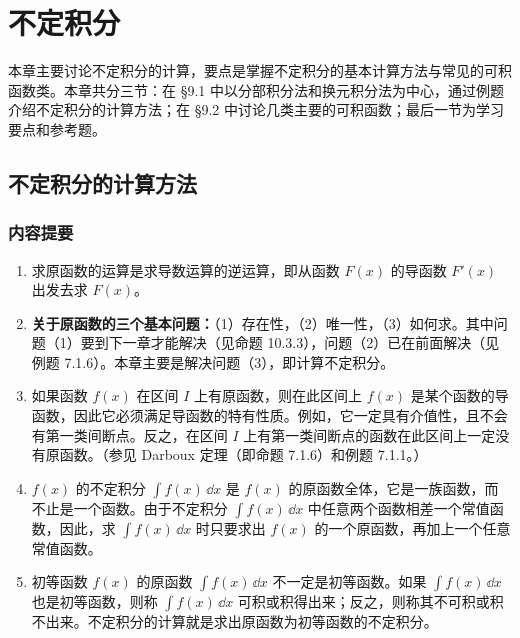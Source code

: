 \chapter{不定积分}


本章主要讨论不定积分的计算，要点是掌握不定积分的基本计算方法与常见的可积函数类。本章共分三节：在 §9.1 中以分部积分法和换元积分法为中心，通过例题介绍不定积分的计算方法；在 §9.2 中讨论几类主要的可积函数；最后一节为学习要点和参考题。

\section{不定积分的计算方法}

\subsection{内容提要}

\begin{enumerate}
  \item 求原函数的运算是求导数运算的逆运算，即从函数 $F(x)$ 的导函数 $F'(x)$ 出发去求 $F(x)$。
  \item \textbf{关于原函数的三个基本问题：}（1）存在性，（2）唯一性，（3）如何求。其中问题（1）要到下一章才能解决（见命题 10.3.3），问题（2）已在前面解决（见例题 7.1.6）。本章主要是解决问题（3），即计算不定积分。
  \item 如果函数 $f(x)$ 在区间 $I$ 上有原函数，则在此区间上 $f(x)$ 是某个函数的导函数，因此它必须满足导函数的特有性质。例如，它一定具有介值性，且不会有第一类间断点。反之，在区间 $I$ 上有第一类间断点的函数在此区间上一定没有原函数。（参见 Darboux 定理（即命题 7.1.6）和例题 7.1.1。）
  \item $f(x)$ 的不定积分 $\int f(x)\,\dd x$ 是 $f(x)$ 的原函数全体，它是一族函数，而不止是一个函数。由于不定积分 $\int f(x)\,\dd x$ 中任意两个函数相差一个常值函数，因此，求 $\int f(x)\,\dd x$ 时只要求出 $f(x)$ 的一个原函数，再加上一个任意常值函数。
  \item 初等函数 $f(x)$ 的原函数 $\int f(x)\,\dd x$ 不一定是初等函数。如果 $\int f(x)\,\dd x$ 也是初等函数，则称 $\int f(x)\,\dd x$ 可积或积得出来；反之，则称其不可积或积不出来。不定积分的计算就是求出原函数为初等函数的不定积分。
\end{enumerate}

